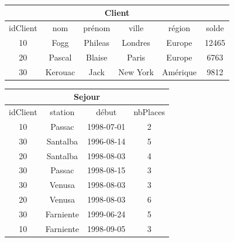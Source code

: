 \begin{slide}

{\tt
\begin{center}
\begin{tabular}{|c|c|c|c|c|c|}\hline
\multicolumn{6}{|c|}{Client}\\\hline \hline
idClient & nom & pr\'enom & ville & r\'egion & solde \\ \hline
10 & Fogg & Phileas & Londres & Europe & 12465\\
20 & Pascal & Blaise & Paris & Europe & 6763\\
30 & Kerouac & Jack  & New York & Am\'erique & 9812\\ \hline
\end{tabular}
\end{center}

\begin{center}
\begin{tabular}{|c|c|c|c|}\hline
\multicolumn{4}{|c|}{Sejour}\\\hline \hline
idClient & station & d\'ebut  & nbPlaces\\ \hline
10 & Passac & 1998-07-01 &  2 \\
30 & Santalba &  1996-08-14 &    5 \\
20 & Santalba & 1998-08-03  & 4 \\
30 & Passac &  1998-08-15 &    3 \\
30 & Venusa &  1998-08-03 &    3 \\
20 & Venusa & 1998-08-03  & 6 \\
30 & Farniente &  1999-06-24 &    5 \\
10 & Farniente & 1998-09-05 &  3 \\ \hline
\end{tabular}
\end{center}
}
\end{slide}

